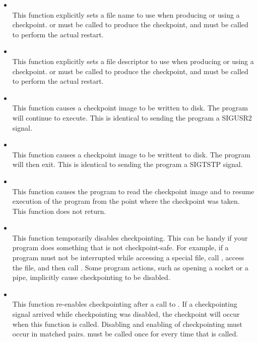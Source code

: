 \begin{itemize}

\item {}\\
This function explicitly sets a file name to use when
producing or using a checkpoint.
 or
 must be called to produce the
checkpoint, and
 must be called to perform the
actual restart.

\item {}\\
This function explicitly sets a file descriptor to use when
producing or using a checkpoint.
 or
 must be called to produce the
checkpoint, and
 must be called to perform the
actual restart.

\item {}\\
This function causes a checkpoint image to be written to disk.
The program will continue to execute.  This is identical to sending
the program a SIGUSR2 signal.

\item {}\\
This function causes a checkpoint image to be writtent to disk.
The program will then exit.  This is identical to sending the program
a SIGTSTP signal.

\item {}\\
This function causes the program to read the checkpoint
image and to resume
execution of the program from the point where the checkpoint
was taken.
This function does not return.

\item {}\\
This function temporarily disables checkpointing.  This can
be handy if your program does something that is not checkpoint-safe.
For example, if a program must not be interrupted while accessing
a special file, call , access the
file, and then call .  Some program
actions, such as opening a socket or a pipe, implicitly cause
checkpointing to be disabled.

\item {}\\
This function re-enables checkpointing after a call to
.  If a checkpointing signal arrived
while checkpointing was disabled, the checkpoint will occur when
this function is called.  Disabling and enabling of checkpointing
must occur in matched pairs.   must
be called once for every time that 
is called.


\end{itemize}
